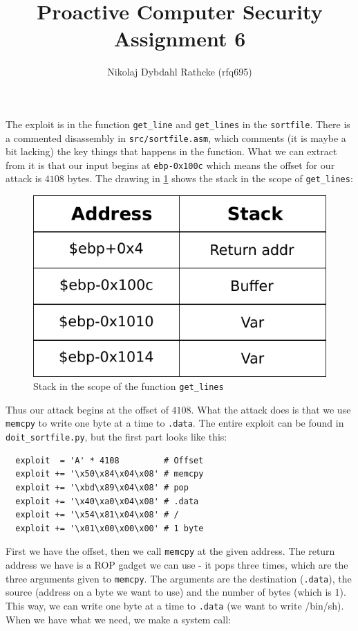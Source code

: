 \documentclass[a4paper]{article}
\author{Nikolaj Dybdahl Rathcke (rfq695)}
\title{Proactive Computer Security \\ Assignment 6}
\begin{document}
\maketitle

The exploit is in the function \texttt{get\_line} and \texttt{get\_lines} in the \texttt{sortfile}. There is a commented disassembly in \texttt{src/sortfile.asm}, which comments (it is maybe a bit lacking) the key things that happens in the function. What we can extract from it is that our input begins at \texttt{ebp-0x100c} which means the offset for our attack is $4108$ bytes. The drawing in \ref{fig1} shows the stack in the scope of \texttt{get\_lines}:
\begin{figure}[H]
  \centering
  \includegraphics{stack}
  \caption{Stack in the scope of the function \texttt{get\_lines}}
  \label{fig1}
\end{figure}
Thus our attack begins at the offset of $4108$. What the attack does is that we use \texttt{memcpy} to write one byte at a time to \texttt{.data}. The entire exploit can be found in \texttt{doit\_sortfile.py}, but the first part looks like this:
\begin{verbatim}
  exploit  = 'A' * 4108         # Offset
  exploit += '\x50\x84\x04\x08' # memcpy
  exploit += '\xbd\x89\x04\x08' # pop
  exploit += '\x40\xa0\x04\x08' # .data
  exploit += '\x54\x81\x04\x08' # /
  exploit += '\x01\x00\x00\x00' # 1 byte
\end{verbatim}
First we have the offset, then we call \texttt{memcpy} at the given address. The return address we have is a ROP gadget we can use - it pops three times, which are the three arguments given to \texttt{memcpy}. The arguments are the destination (\texttt{.data}), the source (address on a byte we want to use) and the number of bytes (which is 1). This way, we can write one byte at a time to \texttt{.data} (we want to write /bin/sh). When we have what we need, we make a system call:
\end{document}
